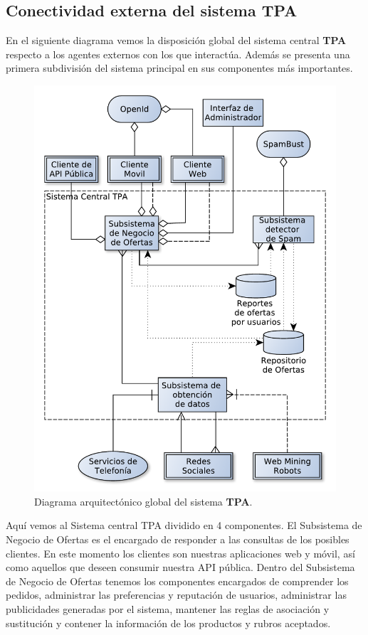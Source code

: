 \subsection{Conectividad externa del sistema \textbf{TPA}}

En el siguiente diagrama vemos la disposición global del sistema central \textbf{TPA} respecto a los agentes externos con los que interactúa. Además se presenta una primera subdivisión del sistema principal en sus componentes más importantes.

\begin{figure}[H]
	\centering
	\includegraphics[width=\textwidth]{graficos/arch/global_overview.pdf}
	\caption{Diagrama arquitectónico global del sistema \textbf{TPA}.}
\end{figure}

Aquí vemos al \textsf{Sistema central TPA} dividido en 4 componentes. El \textsf{Subsistema de Negocio de Ofertas} es el encargado de responder a las consultas de los posibles clientes. En este momento los clientes son nuestras aplicaciones web y móvil, así como aquellos que deseen consumir nuestra API pública. Dentro del \textsf{Subsistema de Negocio de Ofertas} tenemos los componentes encargados de comprender los pedidos, administrar las preferencias y reputación de usuarios, administrar las publicidades generadas por el sistema, mantener las reglas de asociación y sustitución y contener la información de los productos y rubros aceptados.

